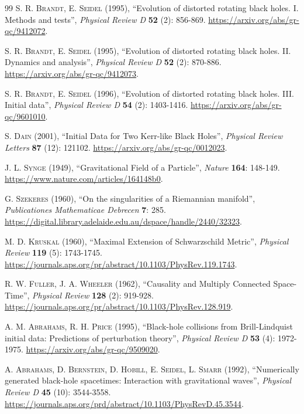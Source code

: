 \documentclass{article}
\begin{document}
\begin{thebibliography}{99}
\textsc{S. R. Brandt, E. Seidel} (1995), ``Evolution of distorted rotating black holes. I. Methods and tests'', \textit{Physical Review D} \textbf{52} (2): 856-869. \url{https://arxiv.org/abs/gr-qc/9412072}.

\textsc{S. R. Brandt, E. Seidel} (1995), ``Evolution of distorted rotating black holes. II. Dynamics and analysis'', \textit{Physical Review D} \textbf{52} (2): 870-886. \url{https://arxiv.org/abs/gr-qc/9412073}.

\textsc{S. R. Brandt, E. Seidel} (1996), ``Evolution of distorted rotating black holes. III. Initial data'', \textit{Physical Review D} \textbf{54} (2): 1403-1416. \url{https://arxiv.org/abs/gr-qc/9601010}.

\textsc{S. Dain} (2001), ``Initial Data for Two Kerr-like Black Holes'', \textit{Physical Review Letters} \textbf{87} (12): 121102. \url{https://arxiv.org/abs/gr-qc/0012023}.

\textsc{J. L. Synge} (1949), ``Gravitational Field of a Particle'', \textit{Nature} \textbf{164}: 148-149. \url{https://www.nature.com/articles/164148b0}.

\textsc{G. Szekeres} (1960), ``On the singularities of a Riemannian manifold'', \textit{Publicationes Mathematicae Debrecen} \textbf{7}: 285. \url{https://digital.library.adelaide.edu.au/dspace/handle/2440/32323}.

\textsc{M. D. Kruskal} (1960), ``Maximal Extension of Schwarzschild Metric'', \textit{Physical Review} \textbf{119} (5): 1743-1745. \url{https://journals.aps.org/pr/abstract/10.1103/PhysRev.119.1743}.

\textsc{R. W. Fuller, J. A. Wheeler} (1962), ``Causality and Multiply Connected Space-Time'', \textit{Physical Review} \textbf{128} (2): 919-928. \url{https://journals.aps.org/pr/abstract/10.1103/PhysRev.128.919}.

\textsc{A. M. Abrahams, R. H. Price} (1995), ``Black-hole collisions from Brill-Lindquist initial data: Predictions of perturbation theory'', \textit{Physical Review D} \textbf{53} (4): 1972-1975. \url{https://arxiv.org/abs/gr-qc/9509020}.

\textsc{A. Abrahams, D. Bernstein, D. Hobill, E. Seidel, L. Smarr} (1992), ``Numerically generated black-hole spacetimes: Interaction with gravitational waves'', \textit{Physical Review D} \textbf{45} (10): 3544-3558. \url{https://journals.aps.org/prd/abstract/10.1103/PhysRevD.45.3544}.


\end{thebibliography}
\end{document}

